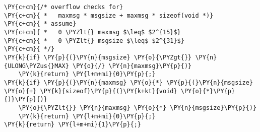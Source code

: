 \begin{Verbatim}[commandchars=\\\{\},codes={\catcode`\$=3\catcode`\^=7\catcode`\_=8}]
\PY{c+cm}{/* overflow checks for}
\PY{c+cm}{ *   maxmsg * msgsize + maxmsg * sizeof(void *)}
\PY{c+cm}{ * assume}
\PY{c+cm}{ *   0 \PYZlt{} maxmsg $\leq$ $2^{15}$}
\PY{c+cm}{ *   0 \PYZlt{} msgsize $\leq$ $2^{31}$}
\PY{c+cm}{ */}
\PY{k}{if} \PY{p}{(}\PY{n}{msgsize} \PY{o}{\PYZgt{}} \PY{n}{ULONG\PYZus{}MAX} \PY{o}{/} \PY{n}{maxmsg}\PY{p}{)}
    \PY{k}{return} \PY{l+m+mi}{0}\PY{p}{;}
\PY{k}{if} \PY{p}{(}\PY{n}{maxmsg} \PY{o}{*} \PY{p}{(}\PY{n}{msgsize} \PY{o}{+} \PY{k}{sizeof}\PY{p}{(}\PY{k+kt}{void} \PY{o}{*}\PY{p}{)}\PY{p}{)}
    \PY{o}{\PYZlt{}} \PY{n}{maxmsg} \PY{o}{*} \PY{n}{msgsize}\PY{p}{)}
    \PY{k}{return} \PY{l+m+mi}{0}\PY{p}{;}
\PY{k}{return} \PY{l+m+mi}{1}\PY{p}{;}
\end{Verbatim}

